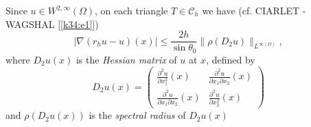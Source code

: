 Since $u \in W^{2, \infty }(\Omega)$, on each triangle $T \in
\mathscr{C}_h$ we have (cf. CIARLET - WAGSHAL [\ref{k34:e1}]) 
\begin{equation}
|\nabla (r_h u -u) (x)| \leq \frac{2h}{\sin \theta_0}\parallel  \rho(D_2
u)\parallel_{L^{\infty (\Omega)}}, \tag{6.70}\label{c2:eq6.70}  
\end{equation}
where $D_2u (x)$ is the \textit{ Hessian matrix} of $u$ at $x$,
defined by  
\begin{equation*}
D_2 u(x)=
\begin{pmatrix}
\frac{\partial^2 u}{\partial x^2_1}(x) & \frac{\partial^2 u}{\partial
  x_1 \partial x_2}(x)\\[10pt]
\frac{\partial^2 u}{\partial x_1 \partial x_2}(x) & \frac{\partial^2
  u}{\partial x^2_2}(x) 
\end{pmatrix}
\end{equation*}
and $\rho (D_2 u (x))$ is the \textit{spectral radius} of $D_2 u(x)$ 

